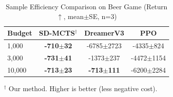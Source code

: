 \begin{table}[h]
\centering
\caption{Sample Efficiency Comparison on Beer Game (Return $\uparrow$, mean$\pm$SE, n=3)}
\label{tab:sample_efficiency}
\begin{tabular}{lccc}
\toprule
Budget & SD-MCTS$^\dagger$ & DreamerV3 & PPO \\
\midrule
1,000 & \textbf{-710$\pm$32} & -6785$\pm$2723 & -4335$\pm$824 \\
3,000 & \textbf{-731$\pm$41} & -1373$\pm$237 & -4472$\pm$1154 \\
10,000 & \textbf{-713$\pm$23} & \textbf{-713$\pm$111} & -6200$\pm$2284 \\
\bottomrule
\end{tabular}
\vspace{1mm}
\footnotesize{$^\dagger$ Our method. Higher is better (less negative cost).}
\end{table}